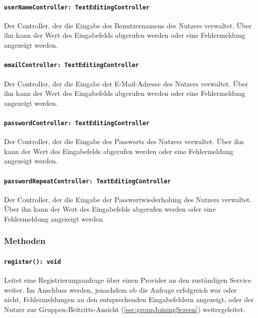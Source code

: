 \documentclass{entwurfsheft}
\begin{document}
\paragraph{\texttt{userNameController: TextEditingController}}
Der Controller, der die Eingabe des Benutzernamens des Nutzers verwaltet. Über ihn kann der Wert des Eingabefelds abgerufen werden oder eine Fehlermeldung angezeigt werden.
\paragraph{\texttt{emailController: TextEditingController}}
Der Controller, der die Eingabe der E-Mail-Ad\-resse des Nutzers verwaltet. Über ihn kann der Wert des Eingabefelds abgerufen werden oder eine Fehlermeldung angezeigt werden.
\paragraph{\texttt{passwordController: TextEditingController}}
Der Controller, der die Eingabe des Passworts des Nutzers verwaltet. Über ihn kann der Wert des Eingabefelds abgerufen werden oder eine Fehlermeldung angezeigt werden.
\paragraph{\texttt{passwordRepeatController: TextEditingController}}
Der Controller, der die Eingabe der Passwortwiederholung des Nutzers verwaltet. Über ihn kann der Wert des Eingabefelds abgerufen werden oder eine Fehlermeldung angezeigt werden.
\subsubsection*{Methoden}
\paragraph{\texttt{register(): void}}
Leitet eine Registrierungsanfrage über einen Provider an den zuständigen Service weiter. Im Anschluss werden, jenachdem ob die Anfrage erfolgreich war oder nicht, Fehlermeldungen an den entsprechenden Eingabefeldern angezeigt, oder der Nutzer zur Gruppen-Beitritts-Ansicht (\ref{sec:groupJoiningScreen}) weitergeleitet.
\newpage
\end{document}
